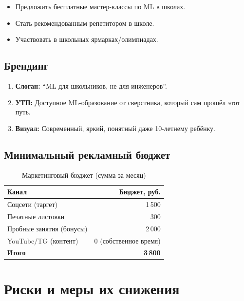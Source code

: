 \documentclass[12pt,a4paper]{article}
\begin{document}
\begin{itemize}
  \item Предложить бесплатные мастер-классы по ML в школах.
  \item Стать рекомендованным репетитором в школе.
  \item Участвовать в школьных ярмарках/олимпиадах.
\end{itemize}

\subsection{Брендинг}

\begin{enumerate}
  \item \textbf{Слоган:} ``ML для школьников, не для инженеров''.
  \item \textbf{УТП:} Доступное ML-образование от сверстника, который сам прошёл этот путь.
  \item \textbf{Визуал:} Современный, яркий, понятный даже 10-летнему ребёнку.
\end{enumerate}

\subsection{Минимальный рекламный бюджет}

\begin{table}[H]
\centering
\caption{Маркетинговый бюджет (сумма за месяц)}
\begin{tabular}{lr}
\toprule
Канал & Бюджет, руб. \\
\midrule
Соцсети (таргет) & 1\,500 \\
Печатные листовки & 300 \\
Пробные занятия (бонусы) & 2\,000 \\
YouTube/TG (контент) & 0 (собственное время) \\
\midrule
\textbf{Итого} & \textbf{3\,800} \\
\bottomrule
\end{tabular}
\end{table}

\section{Риски и меры их снижения}
\end{document}
